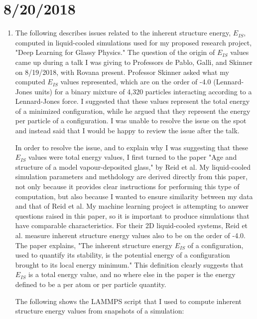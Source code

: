 \documentclass[12pt,reqno]{amsart}
\numberwithin{equation}{section}
\begin{document}
\section{8/20/2018}
\begin{enumerate}
\item The following describes issues related to the inherent structure energy, $E_{IS}$, computed in liquid-cooled simulations used for my proposed research project, "Deep Learning for Glassy Physics."  The question of the origin of $E_{IS}$ values came up during a talk I was giving to Professors de Pablo, Galli, and Skinner on 8/19/2018, with Rovana present.  Professor Skinner asked what my computed $E_{IS}$ values represented, which are on the order of -4.0 (Lennard-Jones units) for a binary mixture of 4,320 particles interacting according to a Lennard-Jones force.  I suggested that these values represent the total energy of a minimized configuration, while he argued that they  represent the energy per particle of a configuration.  I was unable to resolve the issue on the spot and instead said that I would be happy to review the issue after the talk.  
\par In order to resolve the issue, and to explain why I was suggesting that these $E_{IS}$ values were total energy values, I first turned to the paper "Age and structure of a model vapour-deposited glass," by Reid et al.  My liquid-cooled simulation parameters and methdology are derived directly from this paper, not only because it provides clear instructions for performing this type of computation, but also because I wanted to ensure similarity between my data and that of Reid et al.  My machine learning project is attempting to answer questions raised in this paper, so it is important to produce simulations that have comparable characteristics.  For their 2D liquid-cooled systems, Reid et al. measure inherent structure energy values also to be on the order of -4.0.  The paper explains, "The inherent structure energy $E_{IS}$ of a configuration, used to quantify its stability, is the potential energy of a configuration brought to its local energy minimum."  This definition clearly suggests that $E_{IS}$ is a total energy value, and no where else in the paper is the energy defined to be a per atom or per particle quantity.  \par
The following shows the LAMMPS script that I used to compute inherent structure energy values from snapshots of a simulation:


\end{enumerate}
\end{document}
